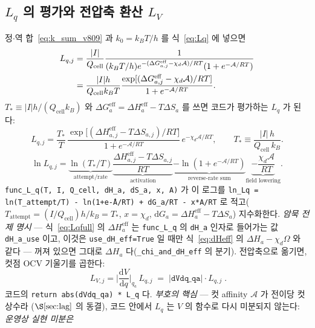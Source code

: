 \documentclass[11pt,a4paper]{article}
\newcommand{\dd}{\mathrm{d}}
\newcommand{\eff}{\mathrm{eff}}
\newcommand{\cell}{\mathrm{cell}}
\newcommand{\code}[1]{\texttt{#1}}
\begin{document}
\subsection{$L_q$ 의 평가와 전압축 환산 $L_V$}
정$\cdot$역 합~\eqref{eq:k_sum_v809} 과 $k_0=k_BT/h$ 를 식~\eqref{eq:Lq} 에 넣으면
\begin{align}
L_{q,j}
&=\frac{|I|}{Q_\cell}
\frac{1}{(k_BT/h)
e^{-(\Delta G_{a,j}^\eff-\chi_d\mathcal A)/RT}
(1+e^{-\mathcal A/RT})}\notag\\
&=\frac{|I|h}{Q_\cell k_BT}
\frac{\exp[(\Delta G_{a,j}^\eff-\chi_d\mathcal A)/RT]}
{1+e^{-\mathcal A/RT}}.
\label{eq:Lq_sub_v809}
\end{align}
$T_*\equiv |I|h/(Q_\cell k_B)$ 와 $\Delta G_a^\eff=\Delta H_a^\eff-T\Delta S_a$ 를 쓰면 코드가 평가하는 $L_q$ 가 된다:
\begin{equation}
L_{q,j}=\frac{T_*}{T}\,\frac{\exp\!\big[(\Delta H_{a,j}^\eff-T\Delta S_{a,j})/RT\big]}{1+e^{-\mathcal A/RT}}
\,e^{-\chi_d\mathcal A/RT},
\qquad T_*\equiv\frac{|I|\,h}{Q_\cell\,k_B}.
\label{eq:Lqfull}
\end{equation}
\begin{equation}
\ln L_{q,j}
=\underbrace{\ln(T_*/T)}_{\text{attempt/rate}}
\underbrace{\frac{\Delta H_{a,j}^\eff-T\Delta S_{a,j}}{RT}}_{\text{activation}}
\underbrace{-\ln(1+e^{-\mathcal A/RT})}_{\text{reverse-rate sum}}
\underbrace{-\frac{\chi_d\mathcal A}{RT}}_{\text{field lowering}} .
\label{eq:Lqlog_terms_v809}
\end{equation}
\code{func\_L\_q(T, I, Q\_cell, dH\_a, dS\_a, x, A)} 가 이 로그를
\code{ln\_Lq = ln(T\_attempt/T) - ln(1+e\^{-A/RT}) + dG\_a/RT - x*A/RT} 로 적고($T_\mathrm{attempt}=(I/Q_\cell)h/k_B=T_*$,
$x=\chi_d$, $\dd G_a=\Delta H_a^\eff-T\Delta S_a$) 지수화한다. \emph{암묵 전제 명시} — 식~\eqref{eq:Lqfull} 의
$\Delta H_a^\eff$ 는 \code{func\_L\_q} 의 \code{dH\_a} 인자로 들어가는 값 \code{dH\_a\_use} 이고, 이것은
\code{use\_dH\_eff=True} 일 때만 식~\eqref{eq:dHeff} 의 $\Delta H_a-\chi_d\Omega$ 와 같다 — 꺼져 있으면 그대로
$\Delta H_a$ 다(\code{\_chi\_and\_dH\_eff} 의 분기). 전압축으로 옮기면, 컷점 OCV 기울기를 곱한다:
\begin{equation}
\boxed{\;L_{V,j}=\Big|\frac{\dd V}{\dd q}\Big|_{q_a}\,L_{q,j}\;=\;|\code{dVdq\_qa}|\cdot L_{q,j}\;.}
\label{eq:LV}
\end{equation}
코드의 \code{return abs(dVdq\_qa) * L\_q} 다. \emph{부호의 핵심} — 컷 affinity $\mathcal A$ 가 전이당 컷 상수라
($\S\ref{sec:lag}$ 의 동결), 코드 안에서 $L_q$ 는 $V$ 의 함수로 다시 미분되지 않는다: \emph{운영상 실현 미분은}
\end{document}
